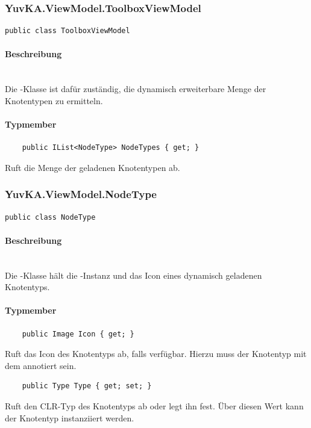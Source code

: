 \subsubsection{YuvKA.ViewModel.ToolboxViewModel}

\begin{verbatim}
public class ToolboxViewModel
\end{verbatim}

\paragraph{Beschreibung}~\\
Die -Klasse ist dafür zuständig, die dynamisch erweiterbare Menge der Knotentypen zu ermitteln.

\paragraph{Typmember}
\begin{itemize}

	\begin{verbatim}
	public IList<NodeType> NodeTypes { get; }
	\end{verbatim}
	Ruft die Menge der geladenen Knotentypen ab.

\end{itemize}

\subsubsection{YuvKA.ViewModel.NodeType}

\begin{verbatim}
public class NodeType
\end{verbatim}

\paragraph{Beschreibung}~\\
Die -Klasse hält die -Instanz und das Icon eines dynamisch geladenen Knotentyps.

\paragraph{Typmember}
\begin{itemize}

	\begin{verbatim}
	public Image Icon { get; }
	\end{verbatim}
	Ruft das Icon des Knotentyps ab, falls verfügbar. Hierzu muss der Knotentyp mit dem  annotiert sein.

	\begin{verbatim}
	public Type Type { get; set; }
	\end{verbatim}
	Ruft den CLR-Typ des Knotentyps ab oder legt ihn fest. Über diesen Wert kann der Knotentyp instanziiert werden.

\end{itemize}